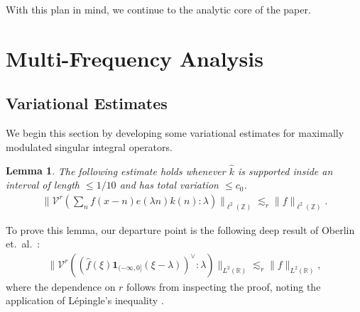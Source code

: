 \documentclass[12pt]{amsart}
\numberwithin{equation}{section}
\newtheorem{lemma}[theorem]{Lemma}
\theoremstyle{definition}
\begin{document}
With this plan in mind, we continue to the analytic core of the paper.
\section{Multi-Frequency Analysis}\label{s:MFanalysis}

\subsection{Variational Estimates}
We begin this section by developing some variational estimates for maximally modulated singular integral operators.

\begin{lemma}\label{l:varcarZ}
The following estimate holds whenever $\widehat{k}$ is supported inside an interval of length $\leq 1/10$ and has total variation $\leq c_0$.
    \begin{align}
        \| \mathcal{V}^r( \sum_{n} f(x-n) e(\lambda n) k(n) : \lambda) \|_{\ell^2(\mathbb{Z})} \lesssim_r  \|f \|_{\ell^2(\mathbb{Z})}. 
    \end{align}
\end{lemma}
To prove this lemma, our departure point is the following deep result of Oberlin et.\ al.\ \cite{O+}:
\begin{align}\label{e:O+}
    \| \mathcal{V}^r( (\widehat{f}(\xi) \mathbf{1}_{(-\infty,0]}(\xi - \lambda) )^{\vee} : \lambda) \|_{L^2(\mathbb{R})} \lesssim_r \|f \|_{L^2(\mathbb{R})},
\end{align}
where the dependence on $r$ follows from inspecting the proof, noting the application of L\'{e}pingle's inequality \cite{LE}.
\end{document}
